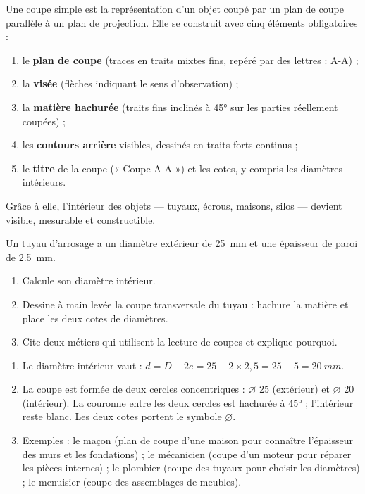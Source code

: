 \documentclass[11pt]{article}
\newcommand{\cle}[1]{{\popxbold\color{popdark}#1}}
\begin{document}
\begin{aretenir}
Une \cle{coupe simple} est la représentation d'un objet coupé par un plan de coupe parallèle à un plan de projection. Elle se construit avec cinq éléments obligatoires :
\begin{enumerate}
\item le \textbf{plan de coupe} (traces en traits mixtes fins, repéré par des lettres : A-A) ;
\item la \textbf{visée} (flèches indiquant le sens d'observation) ;
\item la \textbf{matière hachurée} (traits fins inclinés à 45° sur les parties réellement coupées) ;
\item les \textbf{contours arrière} visibles, dessinés en traits forts continus ;
\item le \textbf{titre} de la coupe (« Coupe A-A ») et les cotes, y compris les diamètres intérieurs.
\end{enumerate}
Grâce à elle, l'intérieur des objets — tuyaux, écrous, maisons, silos — devient visible, mesurable et constructible.
\end{aretenir}

\begin{exercice}
Un tuyau d'arrosage a un diamètre extérieur de \SI{25}{mm} et une épaisseur de paroi de \SI{2,5}{mm}.
\begin{enumerate}
\item Calcule son diamètre intérieur.
\item Dessine à main levée la coupe transversale du tuyau : hachure la matière et place les deux cotes de diamètres.
\item Cite deux métiers qui utilisent la lecture de coupes et explique pourquoi.
\end{enumerate}
\end{exercice}

\begin{corrige}[Exercice]
\begin{enumerate}
\item Le diamètre intérieur vaut : $d = D - 2e = 25 - 2 \times 2,5 = 25 - 5 = \SI{20}{mm}$.
\item La coupe est formée de deux cercles concentriques : $\varnothing$ 25 (extérieur) et $\varnothing$ 20 (intérieur). La couronne entre les deux cercles est hachurée à 45° ; l'intérieur reste blanc. Les deux cotes portent le symbole $\varnothing$.
\item Exemples : le maçon (plan de coupe d'une maison pour connaître l'épaisseur des murs et les fondations) ; le mécanicien (coupe d'un moteur pour réparer les pièces internes) ; le plombier (coupe des tuyaux pour choisir les diamètres) ; le menuisier (coupe des assemblages de meubles).
\end{enumerate}
\end{corrige}
\end{document}
